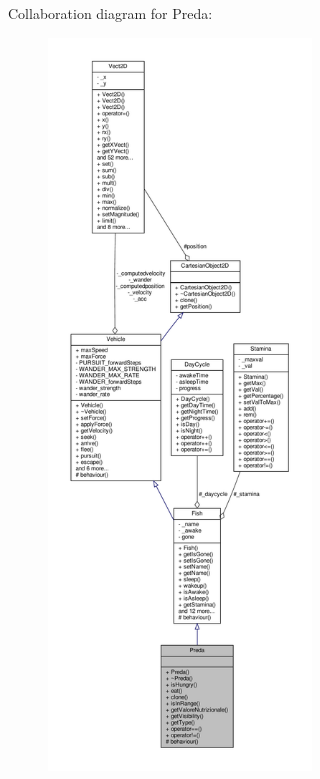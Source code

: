 Collaboration diagram for Preda\+:\nopagebreak
\begin{figure}[H]
\begin{center}
\leavevmode
\includegraphics[height=550pt]{classPreda__coll__graph}
\end{center}
\end{figure}
